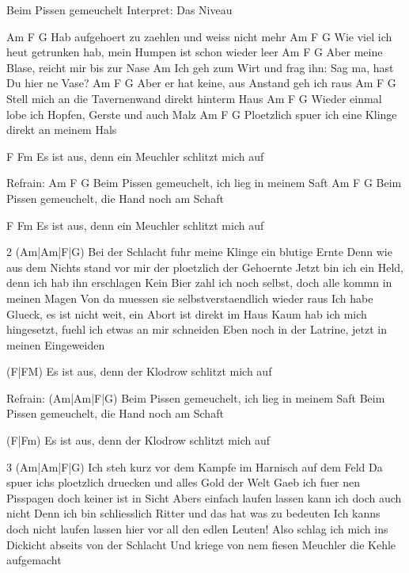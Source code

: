 Beim Pissen gemeuchelt
Interpret: Das Niveau

        Am	           F	       G
Hab aufgehoert zu zaehlen und weiss nicht mehr
	Am	        	                F              G
Wie viel ich heut getrunken hab, mein Humpen ist schon wieder leer
 Am	          F	             G
Aber meine Blase, reicht mir bis zur Nase
    Am
Ich geh zum Wirt und frag ihn: Sag ma, hast Du hier ne Vase?
        Am	       F	       G
Aber er hat keine, aus Anstand geh ich raus
      Am                        F              G
Stell mich an die Tavernenwand direkt hinterm Haus
       Am                       F               G
Wieder einmal lobe ich Hopfen, Gerste und auch Malz
	  Am                     F                G
Ploetzlich spuer ich eine Klinge direkt an meinem Hals

       F	     Fm
Es ist aus, denn ein Meuchler schlitzt mich auf


Refrain:
 	      Am	    F		   G
Beim Pissen gemeuchelt, ich lieg in meinem Saft
    	      Am	    F		   G
Beim Pissen gemeuchelt, die Hand noch am Schaft

       F	     Fm
Es ist aus, denn ein Meuchler schlitzt mich auf


2 (Am|Am|F|G)
Bei der Schlacht fuhr meine Klinge ein blutige Ernte
Denn wie aus dem Nichts stand vor mir der ploetzlich der Gehoernte
Jetzt bin ich ein Held, denn ich hab ihn erschlagen
Kein Bier zahl ich noch selbst, doch alle kommn in meinen Magen
Von da muessen sie selbstverstaendlich wieder raus
Ich habe Glueck, es ist nicht weit, ein Abort ist direkt im Haus
Kaum hab ich mich hingesetzt, fuehl ich etwas an mir schneiden
Eben noch in der Latrine, jetzt in meinen Eingeweiden

(F|FM)
Es ist aus, denn der Klodrow schlitzt mich auf


Refrain: (Am|Am|F|G)
Beim Pissen gemeuchelt, ich lieg in meinem Saft
Beim Pissen gemeuchelt, die Hand noch am Schaft

(F|Fm)
Es ist aus, denn der Klodrow schlitzt mich auf


3 (Am|Am|F|G)
Ich steh kurz vor dem Kampfe im Harnisch auf dem Feld
Da spuer ichs ploetzlich druecken und alles Gold der Welt
Gaeb ich fuer nen Pisspagen doch keiner ist in Sicht
Abers einfach laufen lassen kann ich doch auch nicht
Denn ich bin schliesslich Ritter und das hat was zu bedeuten
Ich kanns doch nicht laufen lassen hier vor all den edlen Leuten!
Also schlag ich mich ins Dickicht abseits von der Schlacht
Und kriege von nem fiesen Meuchler die Kehle aufgemacht


